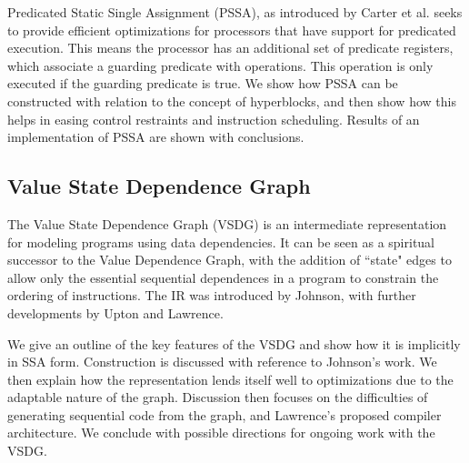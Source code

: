 Predicated Static Single Assignment (PSSA), as introduced by Carter et al.\cite{carter99predicated} seeks to provide efficient optimizations for processors that have support for predicated execution. This means the processor has an additional set of predicate registers, which associate a guarding predicate with operations. This operation is only executed if the guarding predicate is true. We show how PSSA can be constructed with relation to the concept of hyperblocks, and then show how this helps in easing control restraints and instruction scheduling. Results of an implementation of PSSA are shown with conclusions.

\subsection*{Value State Dependence Graph}

The Value State Dependence Graph (VSDG) is an intermediate representation for modeling programs using data dependencies. It can be seen as a spiritual successor to the Value Dependence Graph\cite{177907}, with the addition of ``state" edges to allow only the essential sequential dependences in a program to constrain the ordering of instructions. The IR was introduced by Johnson\cite{UCAM-CL-TR-607,johnson-combined}, with further developments by Upton\cite{upton} and Lawrence\cite{UCAM-CL-TR-705}.

We give an outline of the key features of the VSDG and show how it is implicitly in SSA form. Construction is discussed with reference to Johnson's work. We then explain how the representation lends itself well to optimizations due to the adaptable nature of the graph. Discussion then focuses on the difficulties of generating sequential code from the graph\cite{DBLP:conf/pdpta/Upton03}, and Lawrence's proposed compiler architecture. We conclude with possible directions for ongoing work with the VSDG.
